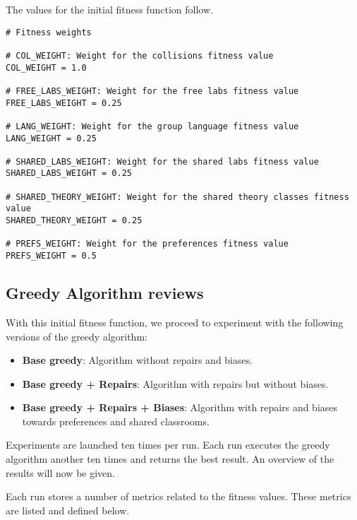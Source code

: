 The values for the initial fitness function follow.

\begin{lstlisting}[basicstyle=\small]
# Fitness weights

# COL_WEIGHT: Weight for the collisions fitness value
COL_WEIGHT = 1.0

# FREE_LABS_WEIGHT: Weight for the free labs fitness value
FREE_LABS_WEIGHT = 0.25

# LANG_WEIGHT: Weight for the group language fitness value
LANG_WEIGHT = 0.25

# SHARED_LABS_WEIGHT: Weight for the shared labs fitness value
SHARED_LABS_WEIGHT = 0.25

# SHARED_THEORY_WEIGHT: Weight for the shared theory classes fitness value
SHARED_THEORY_WEIGHT = 0.25

# PREFS_WEIGHT: Weight for the preferences fitness value
PREFS_WEIGHT = 0.5
\end{lstlisting}



\subsection{Greedy Algorithm reviews}

With this initial fitness function, we proceed to experiment with the following versions of the greedy algorithm:

\begin{itemize}
    \item \textbf{Base greedy}: Algorithm without repairs and biases.
    \item \textbf{Base greedy + Repairs}: Algorithm with repairs but without biases.
    \item \textbf{Base greedy + Repairs + Biases}: Algorithm with repairs and biases towards preferences and shared classrooms.
\end{itemize}

Experiments are launched ten times per run. Each run executes the greedy algorithm another ten times and returns the best result. An overview of the results will now be given.


Each run stores a number of metrics related to the fitness values. These metrics are listed and defined below.

